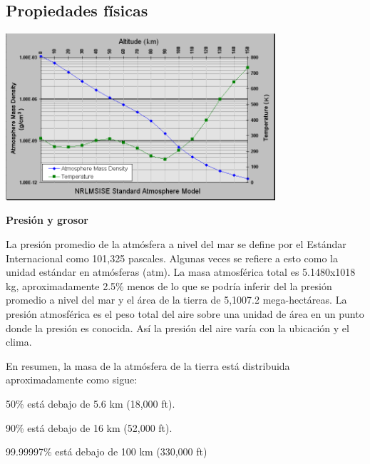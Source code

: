 \documentclass{article} %
\begin{document}
\subsection{Propiedades físicas}

\vspace{0.5 cm}

\begin{center}

 	\includegraphics[width=10cm]{Atmosphere_model.png}    
    
\end{center}

\textbf{Presión y grosor}
\vspace{0.5 cm}

La presión promedio de la atmósfera a nivel del mar se define por el Estándar Internacional como 101,325 pascales. Algunas veces se refiere a esto como la unidad estándar en atmósferas (atm). La masa atmosférica total es 5.1480x1018 kg, aproximadamente 2.5\% menos de lo que se podría inferir del la presión promedio a nivel del mar y el área de la tierra de 5,1007.2 mega-hectáreas. La presión atmosférica es el peso total del aire sobre una unidad de área en un punto donde la presión es conocida. Así la presión del aire varía con la ubicación y el clima.  
\vspace{0.5 cm}

	En resumen, la masa de la atmósfera de la tierra está distribuida aproximadamente como sigue:
\vspace{0.5 cm}

    50\% está debajo de 5.6 km (18,000 ft).
\vspace{0.5 cm}
    
    90\% está debajo de 16 km (52,000 ft).
\vspace{0.5 cm}
    
    99.99997\% está debajo de 100 km (330,000 ft)
\vspace{0.5 cm}
    
\end{document}
